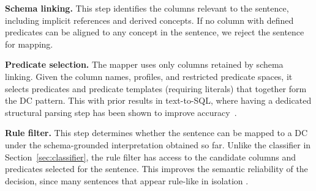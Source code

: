 \smallskip\noindent\textbf{Schema linking.}
This step identifies the columns relevant to the sentence, including implicit 
references and derived concepts. If no column with defined predicates can be aligned to any concept in the sentence, we reject the sentence for mapping.

\smallskip\noindent\textbf{Predicate selection.} The mapper uses only columns retained by schema linking. Given the column names, profiles, and restricted predicate spaces, it selects predicates and predicate templates (requiring literals) that together form the DC pattern. This  with prior results in text-to-SQL, where having a dedicated structural parsing step has been shown to improve accuracy~\cite{resdsql2023}.

\smallskip\noindent\textbf{Rule filter.}
This step determines whether the sentence can be mapped to a DC under the schema-grounded interpretation obtained so far. Unlike the classifier in Section~\ref{sec:classifier}, the rule filter has access to the candidate columns and predicates selected for the sentence. This improves the semantic reliability of the decision, since many sentences that appear rule-like in isolation . %
%

